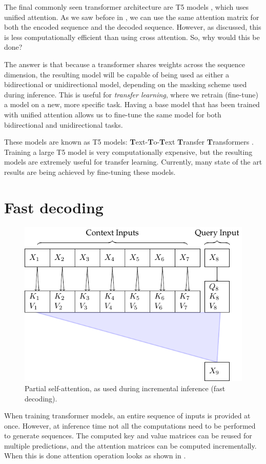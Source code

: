 The final commonly seen transformer architecture are T5 models \cite{t5}, which uses unified attention. As we saw before in , we can use the same attention matrix for both the encoded sequence and the decoded sequence. However, as discussed, this is less computationally efficient than using cross attention. So, why would this be done?

The answer is that because a transformer shares weights across the sequence dimension, the resulting model will be capable of being used as either a bidirectional or unidirectional model, depending on the masking scheme used during inference. This is useful for \textit{transfer learning}, where we retrain (fine-tune) a model on a new, more specific task. Having a base model that has been trained with unified attention allows us to fine-tune the same model for both bidirectional and unidirectional tasks.

These models are known as T5 models: \textbf{T}ext-\textbf{T}o-\textbf{T}ext \textbf{T}ransfer \textbf{T}ransformers \cite{t5}. Training a large T5 model is very computationally expensive, but the resulting models are extremely useful for transfer learning. Currently, many state of the art results are being achieved by fine-tuning these models.

\section{Fast decoding}
\label{sec:fast-decoding}

\begin{figure}
    \centering
    \includegraphics[]{figures/attn-4-partial.pdf}
    \caption[Partial self-attention]{Partial self-attention, as used during incremental inference (fast decoding).}
    \hrulefill
    \label{fig:partial-self-attn}
\end{figure}

When training transformer models, an entire sequence of inputs is provided at once. However, at inference time not all the computations need to be performed to generate sequences. The computed key and value matrices can be reused for multiple predictions, and the attention matrices can be computed incrementally. When this is done attention operation looks as shown in .
